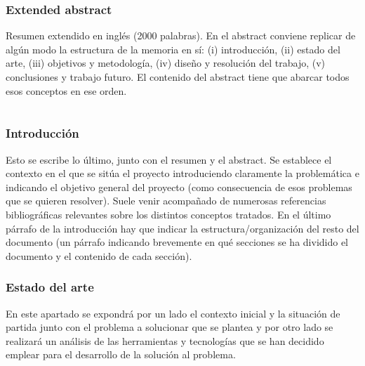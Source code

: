 \documentclass[12pt]{article}
\begin{document}
\clearpage

\section{Extended abstract}
Resumen extendido en inglés (2000 palabras). En el abstract conviene replicar de algún modo la estructura de la memoria en sí: (i) introducción, (ii) estado del arte, (iii) objetivos y metodología, (iv) diseño y resolución del trabajo, (v) conclusiones y trabajo futuro. El contenido del abstract tiene que abarcar todos esos conceptos en ese orden.

\cleardoublepage

\part*{}
\setcounter{page}{1} %

\section{Introducción}
Esto se escribe lo último, junto con el resumen y el abstract. Se establece el contexto en el que se sitúa el proyecto introduciendo claramente la problemática e indicando el objetivo general del proyecto (como consecuencia de esos problemas que se quieren resolver). Suele venir acompañado de numerosas referencias bibliográficas relevantes sobre los distintos conceptos tratados. En el último párrafo de la introducción hay que indicar la estructura/organización del resto del documento (un párrafo indicando brevemente en qué secciones se ha dividido el documento y el contenido de cada sección).

\clearpage
\section{Estado del arte}
En este apartado se expondrá por un lado el contexto inicial y la situación de partida junto con el problema a solucionar que se plantea y por 
otro lado se realizará un análisis de las herramientas y tecnologías que se han decidido emplear para el desarrollo de la solución al problema.
\end{document}
